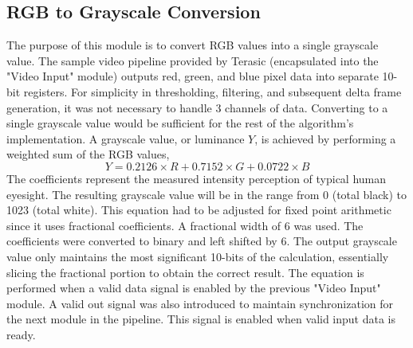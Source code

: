 \documentclass[11pt]{article} %
\begin{document}
\subsection{RGB to Grayscale Conversion}
The purpose of this module is to convert RGB values into a single grayscale value. The sample video pipeline provided by Terasic (encapsulated into the "Video Input" module) outputs red, green, and blue pixel data into separate 10-bit registers. For simplicity in thresholding, filtering, and subsequent delta frame generation, it was not necessary to handle 3 channels of data. Converting to a single grayscale value would be sufficient for the rest of the algorithm's implementation. A grayscale value, or luminance $Y$, is achieved by performing a weighted sum of the RGB values,
\begin{equation}
Y =  0.2126\times R + 0.7152\times G + 0.0722\times B
\end{equation}
The coefficients represent the measured intensity perception of typical human eyesight. The resulting grayscale value will be in the range from 0 (total black) to 1023 (total white). This equation had to be adjusted for fixed point arithmetic since it uses fractional coefficients. A fractional width of 6 was used. The coefficients were converted to binary and left shifted by 6. The output grayscale value only maintains the most significant 10-bits of the calculation, essentially slicing the fractional portion to obtain the correct result. The equation is performed when a valid data signal is enabled by the previous "Video Input" module. A valid out signal was also introduced to maintain synchronization for the next module in the pipeline. This signal is enabled when valid input data is ready. 
\end{document}
